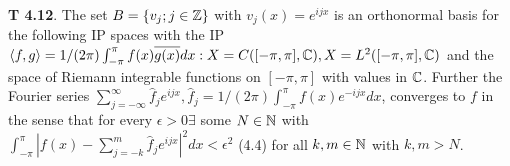 {\bf T 4.12}. The set $B=\{v_j;j\in \mathbb{Z}\}$ with $v_j(x)=e^{ijx}$ is an orthonormal basis for the following IP spaces with the IP $\langle f,g \rangle = 1/(2 \pi) \int_{-\pi}^{\pi} f(x)\overline{g(x)}dx: X=C([-\pi, \pi],\mathbb{C}), X = L^2([-\pi, \pi],\mathbb{C})$ and the space of Riemann integrable functions on $[-\pi, \pi]$ with values in $\mathbb{C}$. Further the Fourier series $\sum_{j=-\infty}^{\infty}\hat{f}_je^{ijx}, \hat{f}_j=1/(2\pi)\int_{-\pi}^{\pi}f(x)e^{-ijx}dx$, converges to $f$ in the sense that for every $\epsilon >0 \exists$ some $N \in \mathbb{N}$ with $\int_{-\pi}^{\pi}|f(x)-\sum_{j=-k}^m\hat{f}_je^{ijx}|^2dx<\epsilon^2$ (4.4) for all $k,m \in \mathbb{N}$ with $k,m>N$. 
